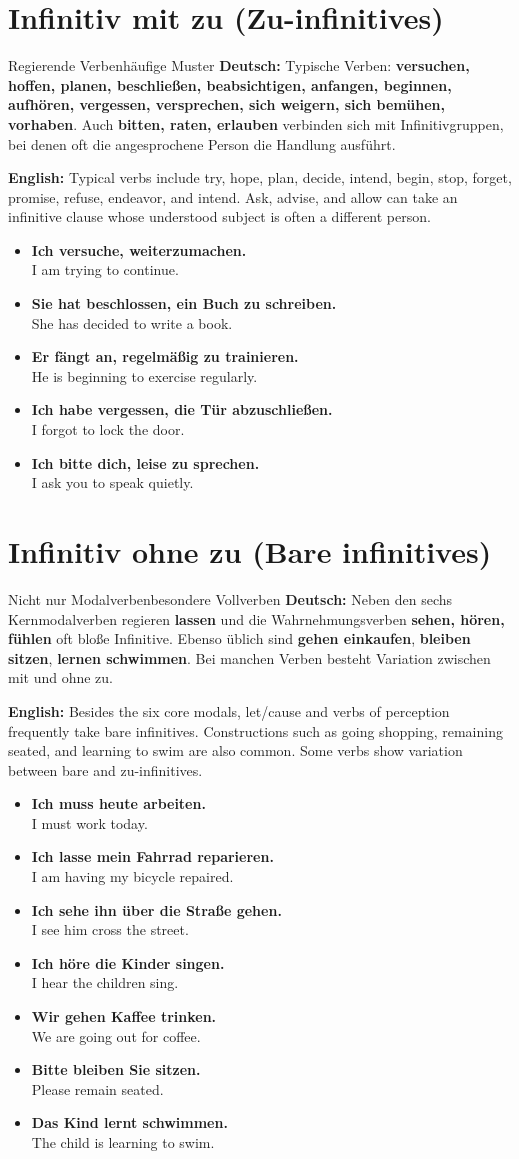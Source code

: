 \documentclass[a4paper,11pt]{article}
\newcommand{\GermanText}[1]{\textbf{Deutsch: }#1\par}
\newcommand{\EnglishText}[1]{{\small\color{SoftGray}\textbf{English: }#1\par}}
\newcommand{\ExampleItem}[2]{\item \textbf{#1}\\{\small\color{SoftGray}#2}}
\newcommand{\DEEN}[2]{\GermanText{#1}\EnglishText{#2}}
\newcommand{\Pair}[2]{\ExampleItem{#1}{#2}}
\begin{document}
\section{Infinitiv mit zu \textnormal{(Zu-infinitives)}}
\begin{grammarentry}{Regierende Verben}{häufige Muster}
\DEEN{Typische Verben: \textbf{versuchen, hoffen, planen, beschließen, beabsichtigen, anfangen, beginnen, aufhören, vergessen, versprechen, sich weigern, sich bemühen, vorhaben}. Auch \textbf{bitten, raten, erlauben} verbinden sich mit Infinitivgruppen, bei denen oft die angesprochene Person die Handlung ausführt.}{Typical verbs include try, hope, plan, decide, intend, begin, stop, forget, promise, refuse, endeavor, and intend. Ask, advise, and allow can take an infinitive clause whose understood subject is often a different person.}
\end{grammarentry}
\begin{exbox}\begin{itemize}
\Pair{Ich versuche, weiterzumachen.}{I am trying to continue.}
\Pair{Sie hat beschlossen, ein Buch zu schreiben.}{She has decided to write a book.}
\Pair{Er fängt an, regelmäßig zu trainieren.}{He is beginning to exercise regularly.}
\Pair{Ich habe vergessen, die Tür abzuschließen.}{I forgot to lock the door.}
\Pair{Ich bitte dich, leise zu sprechen.}{I ask you to speak quietly.}
\end{itemize}\end{exbox}

\section{Infinitiv ohne zu \textnormal{(Bare infinitives)}}
\begin{grammarentry}{Nicht nur Modalverben}{besondere Vollverben}
\DEEN{Neben den sechs Kernmodalverben regieren \textbf{lassen} und die Wahrnehmungsverben \textbf{sehen, hören, fühlen} oft bloße Infinitive. Ebenso üblich sind \textbf{gehen einkaufen}, \textbf{bleiben sitzen}, \textbf{lernen schwimmen}. Bei manchen Verben besteht Variation zwischen mit und ohne zu.}{Besides the six core modals, let/cause and verbs of perception frequently take bare infinitives. Constructions such as going shopping, remaining seated, and learning to swim are also common. Some verbs show variation between bare and zu-infinitives.}
\end{grammarentry}
\begin{exbox}\begin{itemize}
\Pair{Ich muss heute arbeiten.}{I must work today.}
\Pair{Ich lasse mein Fahrrad reparieren.}{I am having my bicycle repaired.}
\Pair{Ich sehe ihn über die Straße gehen.}{I see him cross the street.}
\Pair{Ich höre die Kinder singen.}{I hear the children sing.}
\Pair{Wir gehen Kaffee trinken.}{We are going out for coffee.}
\Pair{Bitte bleiben Sie sitzen.}{Please remain seated.}
\Pair{Das Kind lernt schwimmen.}{The child is learning to swim.}
\end{itemize}\end{exbox}
\end{document}
